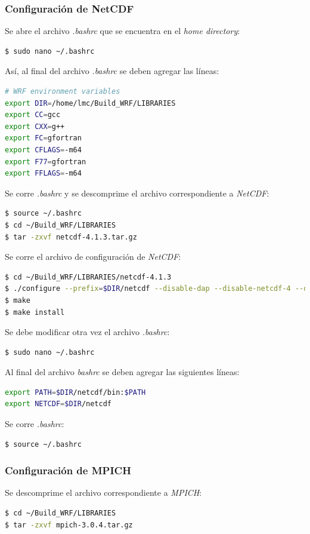 \documentclass[12pt,letter]{article}
\begin{document}
\subsubsection*{Configuraci\'on de NetCDF}
\noindent Se abre el archivo \textit{.bashrc} que se encuentra en el \textit{home directory}:
\begin{lstlisting}[language=bash]
$ sudo nano ~/.bashrc
\end{lstlisting}

\noindent As\'i, al final del archivo \textit{.bashrc} se deben agregar las l\'ineas:
\begin{lstlisting}[language=bash]
# WRF environment variables
export DIR=/home/lmc/Build_WRF/LIBRARIES
export CC=gcc
export CXX=g++
export FC=gfortran
export CFLAGS=-m64
export F77=gfortran
export FFLAGS=-m64
\end{lstlisting}

\noindent Se corre \textit{.bashrc} y se descomprime el archivo correspondiente a \textit{NetCDF}:

\begin{lstlisting}[language=bash]
$ source ~/.bashrc
$ cd ~/Build_WRF/LIBRARIES
$ tar -zxvf netcdf-4.1.3.tar.gz
\end{lstlisting}

\noindent Se corre el archivo de configuraci\'on de \textit{NetCDF}:
\begin{lstlisting}[language=bash]
$ cd ~/Build_WRF/LIBRARIES/netcdf-4.1.3
$ ./configure --prefix=$DIR/netcdf --disable-dap --disable-netcdf-4 --disable-shared
$ make
$ make install
\end{lstlisting}

\noindent Se debe modificar otra vez el archivo \textit{.bashrc}:
\begin{lstlisting}[language=bash]
$ sudo nano ~/.bashrc
\end{lstlisting}

\noindent Al final del archivo \textit{bashrc} se deben agregar las siguientes l\'ineas:
\begin{lstlisting}[language=bash]
export PATH=$DIR/netcdf/bin:$PATH
export NETCDF=$DIR/netcdf
\end{lstlisting}

\noindent Se corre \textit{.bashrc}:
\begin{lstlisting}[language=bash]
$ source ~/.bashrc
\end{lstlisting}

\subsubsection*{Configuraci\'on de MPICH}
Se descomprime el archivo correspondiente a \textit{MPICH}:
\begin{lstlisting}[language=bash]
$ cd ~/Build_WRF/LIBRARIES
$ tar -zxvf mpich-3.0.4.tar.gz
\end{lstlisting}
\end{document}
